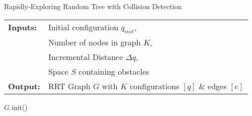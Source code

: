 \bigskip
\begin{algorithm}[H]
    \caption{Rapidly-Exploring Random Tree with Collision Detection}
    \SetAlgoLined
    \begin{tabular}{l l}
    \textbf{Inputs:}    & Initial configuration $q_{init}$,\\ 
                        & Number of nodes in graph $K$, \\
                        & Incremental Distance $\Delta q$, \\
                        & Space $S$ containing obstacles \\
    \textbf{Output:}    & RRT Graph $G$ with $K$ configurations $[q]$ \& edges $[e]$ \\
    \end{tabular}

        $G$.init()\;
\label{algorithm:rrt_collision}
\end{algorithm}
\bigskip